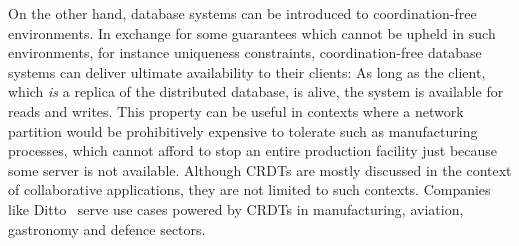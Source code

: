 On the other hand, database systems can be introduced to coordination-free
environments.
In exchange for some guarantees which cannot be upheld in such environments,
for instance uniqueness constraints,
coordination-free database systems can deliver ultimate availability
to their clients:
As long as the client, which \emph{is} a replica of the distributed database,
is alive, the system is available for reads and writes.
This property can be useful in contexts where a network partition would be
prohibitively expensive to tolerate such as manufacturing processes,
which cannot afford to stop an entire production facility just because
some server is not available.
Although \acp{CRDT} are mostly discussed in the context of collaborative
applications, they are not limited to such contexts.
Companies like Ditto~\cite{ditto} serve use cases powered by \acp{CRDT}
in manufacturing, aviation, gastronomy and defence sectors.



